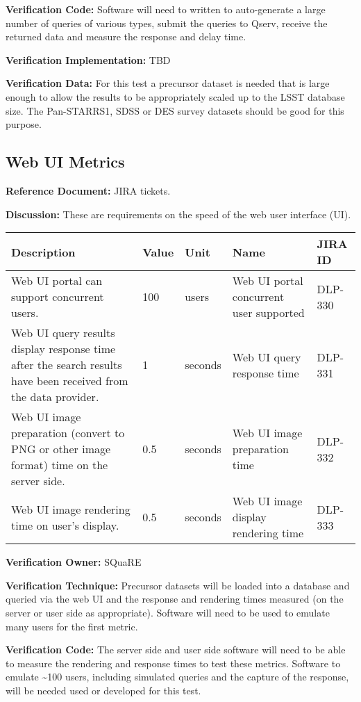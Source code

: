 \documentclass[DM,lsstdraft,toc]{lsstdoc}
\begin{document}
\textbf{Verification Code:} Software will need to written to
auto-generate a large number of queries of various types, submit the
queries to Qserv, receive the returned data and measure the response and
delay time.

\textbf{Verification Implementation:} TBD

\textbf{Verification Data:} For this test a precursor dataset is needed
that is large enough to allow the results to be appropriately scaled up
to the LSST database size. The Pan-STARRS1, SDSS or DES survey datasets
should be good for this purpose.

\subsection{Web UI Metrics}\label{web-ui-metrics}

\textbf{Reference Document:} JIRA tickets.

\textbf{Discussion:} These are requirements on the speed of the web user
interface (UI).

\begin{longtable}[]{@{}p{}llp{1.5in}l@{}}
\toprule
Description & Value & Unit & Name & JIRA ID\tabularnewline
\midrule
\endhead
Web UI portal can support concurrent users. & 100 & users & Web UI
portal concurrent user supported & DLP-330\tabularnewline
Web UI query results display response time after the search results have
been received from the data provider. & 1 & seconds & Web UI query
response time & DLP-331\tabularnewline
Web UI image preparation (convert to PNG or other image format) time on
the server side. & 0.5 & seconds & Web UI image preparation time &
DLP-332\tabularnewline
Web UI image rendering time on user's display. & 0.5 & seconds & Web UI
image display rendering time & DLP-333\tabularnewline
\bottomrule
\end{longtable}

\textbf{Verification Owner:} SQuaRE

\textbf{Verification Technique:} Precursor datasets will be loaded into
a database and queried via the web UI and the response and rendering
times measured (on the server or user side as appropriate). Software
will need to be used to emulate many users for the first metric.

\textbf{Verification Code:} The server side and user side software will
need to be able to measure the rendering and response times to test
these metrics. Software to emulate \textasciitilde{}100 users, including
simulated queries and the capture of the response, will be needed used
or developed for this test.
\end{document}
